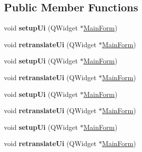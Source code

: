 \subsection*{Public Member Functions}
\begin{DoxyCompactItemize}
\item 
void {\bfseries setup\+Ui} (Q\+Widget $\ast$\hyperlink{class_main_form}{Main\+Form})\hypertarget{class_ui___main_form_a96cb87a6a510a80d254dc24c17f8ade6}{}\label{class_ui___main_form_a96cb87a6a510a80d254dc24c17f8ade6}

\item 
void {\bfseries retranslate\+Ui} (Q\+Widget $\ast$\hyperlink{class_main_form}{Main\+Form})\hypertarget{class_ui___main_form_a2db2cb834298dc62a03157b2423d035b}{}\label{class_ui___main_form_a2db2cb834298dc62a03157b2423d035b}

\item 
void {\bfseries setup\+Ui} (Q\+Widget $\ast$\hyperlink{class_main_form}{Main\+Form})\hypertarget{class_ui___main_form_a96cb87a6a510a80d254dc24c17f8ade6}{}\label{class_ui___main_form_a96cb87a6a510a80d254dc24c17f8ade6}

\item 
void {\bfseries retranslate\+Ui} (Q\+Widget $\ast$\hyperlink{class_main_form}{Main\+Form})\hypertarget{class_ui___main_form_a2db2cb834298dc62a03157b2423d035b}{}\label{class_ui___main_form_a2db2cb834298dc62a03157b2423d035b}

\item 
void {\bfseries setup\+Ui} (Q\+Widget $\ast$\hyperlink{class_main_form}{Main\+Form})\hypertarget{class_ui___main_form_a96cb87a6a510a80d254dc24c17f8ade6}{}\label{class_ui___main_form_a96cb87a6a510a80d254dc24c17f8ade6}

\item 
void {\bfseries retranslate\+Ui} (Q\+Widget $\ast$\hyperlink{class_main_form}{Main\+Form})\hypertarget{class_ui___main_form_a2db2cb834298dc62a03157b2423d035b}{}\label{class_ui___main_form_a2db2cb834298dc62a03157b2423d035b}

\item 
void {\bfseries setup\+Ui} (Q\+Widget $\ast$\hyperlink{class_main_form}{Main\+Form})\hypertarget{class_ui___main_form_a96cb87a6a510a80d254dc24c17f8ade6}{}\label{class_ui___main_form_a96cb87a6a510a80d254dc24c17f8ade6}

\item 
void {\bfseries retranslate\+Ui} (Q\+Widget $\ast$\hyperlink{class_main_form}{Main\+Form})\hypertarget{class_ui___main_form_a2db2cb834298dc62a03157b2423d035b}{}\label{class_ui___main_form_a2db2cb834298dc62a03157b2423d035b}


\end{DoxyCompactItemize}
